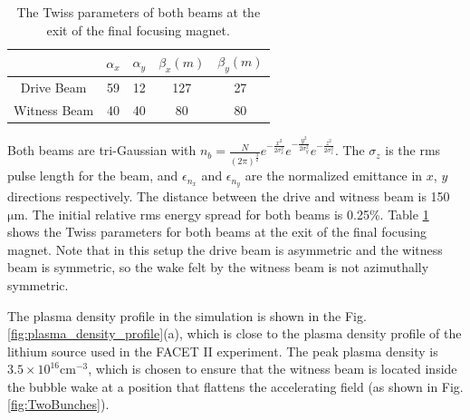 \documentclass[%
reprint, superscriptaddress,
 amsmath,amssymb, aps,
prstab,
]{revtex4-2}
\begin{document}
\begin{table}[htbp] \begin{center}
\begin{tabular}{|c | c c c c|} \hline & $\alpha_x$ & $\alpha_y$&
$\beta_x(m)$ & $\beta_y(m)$ \\ [0.5ex] \hline Drive Beam & 59 & 12 & 127
& 27\\ \hline Witness Beam & 40 & 40 & 80 & 80\\ \hline \end{tabular}
\end{center} \caption{The Twiss parameters of both beams at the exit of
the final focusing magnet.} \label{table2} \end{table}

Both beams are tri-Gaussian with $n_b = \frac{N}{(2 \pi)^{\frac{3}{2}}} e^{-\frac{x^2}{2\sigma_x^2}} e^{-\frac{y^2}{2\sigma_y^2}} e^{-\frac{z^2}{2\sigma_z^2}}$. The $\sigma_z$ is the rms pulse length for the
beam, and $\epsilon_{n_x}$ and $\epsilon_{n_y}$ are the normalized
emittance in $x$, $y$ directions respectively. The distance between the
drive and witness beam is 150 $\mathrm{\mu m}$. The initial relative rms
energy spread for both beams is 0.25\%. Table \ref{table2} shows the
Twiss parameters for both beams at the exit of the final focusing
magnet. Note that in this setup the drive beam is asymmetric and the
witness beam is symmetric, so the wake felt by the witness beam is not azimuthally symmetric.

The plasma density profile in the simulation is shown in the Fig.
\ref{fig:plasma_density_profile}(a), which is close to the plasma density
profile of the lithium source used in the FACET II experiment. The peak plasma density is
$\mathrm{3.5 \times 10^{16} cm^{-3}}$, which is chosen to ensure that the witness beam
is located inside the bubble wake at a position that flattens the
accelerating field (as shown in Fig. \ref{fig:TwoBunches}).

\end{document}
